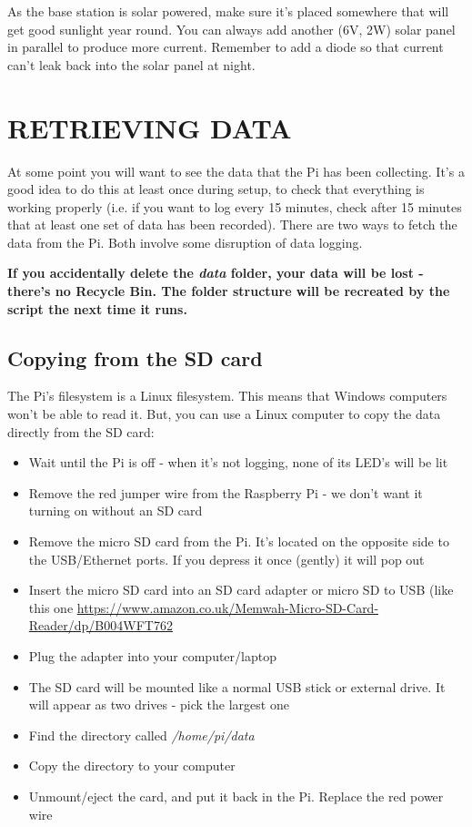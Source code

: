 \documentclass[10pt]{article}
\begin{document}
As the base station is solar powered, make sure it's placed somewhere that will get good sunlight year round. You can always add another (6V, 2W) solar panel in parallel to produce more current. Remember to add a diode so that current can't leak back into the solar panel at night.

\section{RETRIEVING DATA}

At some point you will want to see the data that the Pi has been collecting. It's a good idea to do this at least once during setup, to check that everything is working properly (i.e. if you want to log every 15 minutes, check after 15 minutes that at least one set of data has been recorded). There are two ways to fetch the data from the Pi. Both involve some disruption of data logging. \newline

\textbf{If you accidentally delete the \textit{data} folder, your data will be lost - there's no Recycle Bin. The folder structure will be recreated by the script the next time it runs.}

\subsection{Copying from the SD card}
The Pi's filesystem is a Linux filesystem. This means that Windows computers won't be able to read it. But, you can use a Linux computer to copy the data directly from the SD card:

\begin{itemize}
 \item Wait until the Pi is off - when it's not logging, none of its LED's will be lit 
 \item Remove the red jumper wire from the Raspberry Pi - we don't want it turning on without an SD card
 \item Remove the micro SD card from the Pi. It's located on the opposite side to the USB/Ethernet ports. If you depress it once (gently) it will pop out
 \item Insert the micro SD card into an SD card adapter or micro SD to USB (like this one \url{https://www.amazon.co.uk/Memwah-Micro-SD-Card-Reader/dp/B004WFT762}
 \item Plug the adapter into your computer/laptop
 \item The SD card will be mounted like a normal USB stick or external drive. It will appear as two drives - pick the largest one
 \item Find the directory called \textit{/home/pi/data}
 \item Copy the directory to your computer
 \item Unmount/eject the card, and put it back in the Pi. Replace the red power wire
\end{itemize}
\end{document}
